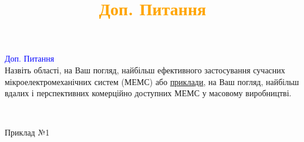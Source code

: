 \documentclass[aspectratio=169]{beamer}
\begin{document}
{



\begin{frame}%
\textcolor{blue}{\large Доп. Питання}\\
\Large{Назвіть області, на Ваш погляд, найбільш ефективного застосування сучасних мікроелектромеханічних систем (МЕМС) або \underline{приклади}, на Ваш погляд, найбільш вдалих і перспективних комерційно доступних МЕМС у масовому виробництві.}
\end{frame}
}



{
\title{\textcolor{orange}{Доп. Питання}}
\begin{frame}
\\
\begin{minipage}[h]{0.3\linewidth}
 Приклад №1\\ 

\end{minipage}
\end{frame}}
\end{document}
